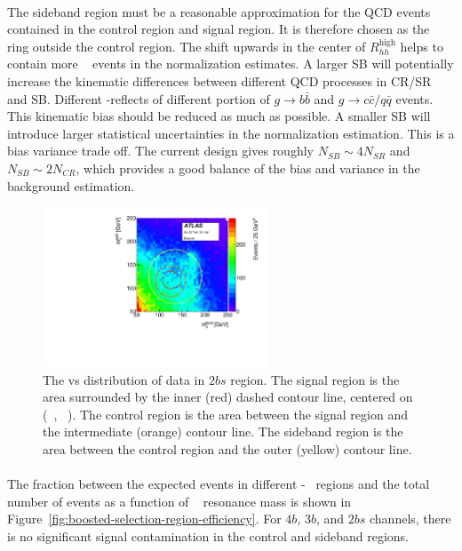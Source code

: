 \paragraph{}
The sideband region must be a reasonable approximation for the QCD events contained in the control region and signal region.
It is therefore chosen as the ring outside the control region.
The shift upwards in the center of $R_{hh}^{\text{high}}$ helps to contain more \ttbar~ events in the normalization estimates.
A larger SB will potentially increase the kinematic differences between different QCD processes in CR/SR and SB.
Different \mleadJ-\msublJ reflects of different portion of $g \to b\bar{b}$ and $g \to c\bar{c}/q\bar{q}$ events.
This kinematic bias should be reduced as much as possible.
A smaller SB will introduce larger statistical uncertainties in the normalization estimation.
This is a bias variance trade off.
The current design gives roughly $N_{SB} \sim 4 N_{SR}$ and $N_{SB} \sim 2 N_{CR}$, which provides a good balance of the bias and variance in the background estimation.

\begin{figure}[htbp!]
\begin{center}
  \includegraphics[width=0.6\textwidth,angle=-90]{figures/boosted/Other/TwoTag_split_Incl_data_mH0H1.pdf}
  \caption{The \mleadJ vs \msublJ distribution of data in $2bs$ region. The signal region is the area surrounded by the inner (red) dashed contour line, centered on (~\GeV, ~\GeV). The control region is the area between the signal region and the intermediate (orange) contour line. The sideband region is the area between the control region and the outer (yellow) contour line.}
  \label{fig:boosted-region-def}
\end{center}
\end{figure}

\paragraph{}
The fraction between the expected events in different \mleadJ-\msublJ~ regions and the total number of events as a function of \Grav~ resonance mass is shown in Figure~\ref{fig:boosted-selection-region-efficiency}. 
For $4b$, $3b$, and $2bs$ channels, there is no significant signal contamination in the control and sideband regions.


